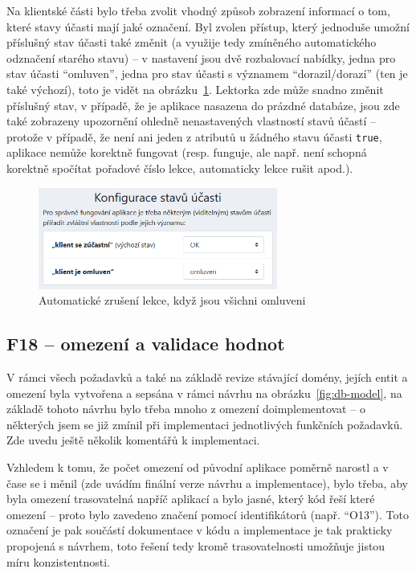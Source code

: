Na klientské části bylo třeba zvolit vhodný způsob zobrazení informací o tom, které stavy účasti mají jaké označení. Byl zvolen přístup, který jednoduše umožní příslušný stav účasti také změnit (a využije tedy zmíněného automatického odznačení starého stavu) -- v nastavení jsou dvě rozbalovací nabídky, jedna pro stav účasti \enquote{omluven}, jedna pro stav účasti s významem \enquote{dorazil/dorazí} (ten je také výchozí), toto je vidět na obrázku~\ref{fig:ui-screen-vlastnostistavu}. Lektorka zde může snadno změnit příslušný stav, v případě, že je aplikace nasazena do prázdné databáze, jsou zde také zobrazeny upozornění ohledně nenastavených vlastností stavů účastí -- protože v případě, že není ani jeden z atributů u žádného stavu účasti \verb|true|, aplikace nemůže korektně fungovat (resp. funguje, ale např. není schopná korektně spočítat pořadové číslo lekce, automaticky lekce rušit apod.).

\begin{figure}[h]\centering
    \includegraphics[width=0.7\textwidth]{img/ui-screen-vlastnostistavu.png}
    \caption{Automatické zrušení lekce, když jsou všichni omluveni}\label{fig:ui-screen-vlastnostistavu}
\end{figure}

\subsection{F18 -- omezení a validace hodnot}\label{subsec:F18implementace}

V rámci všech požadavků a také na základě revize stávající domény, jejích entit a omezení byla vytvořena a sepsána v rámci návrhu na obrázku~\ref{fig:db-model}, na základě tohoto návrhu bylo třeba mnoho z omezení doimplementovat -- o některých jsem se již zmínil při implementaci jednotlivých funkčních požadavků. Zde uvedu ještě několik komentářů k implementaci.

Vzhledem k tomu, že počet omezení od původní aplikace poměrně narostl a v čase se i měnil (zde uvádím finální verze návrhu a implementace), bylo třeba, aby byla omezení trasovatelná napříč aplikací a bylo jasné, který kód řeší které omezení -- proto bylo zavedeno značení pomocí identifikátorů (např. \enquote{O13}). Toto označení je pak součástí dokumentace v kódu a implementace je tak prakticky propojená s návrhem, toto řešení tedy kromě trasovatelnosti umožňuje jistou míru konzistentnosti.

